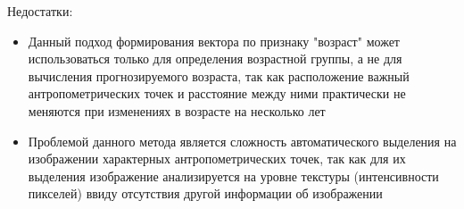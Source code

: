 \documentclass[12pt,a4paper]{article}
\begin{document}
Недостатки:
\begin{itemize}
    \item Данный подход формирования вектора по признаку "возраст" может использоваться только для определения возрастной группы, а не для вычисления прогнозируемого возраста, так как расположение важный антропометрических точек и расстояние между ними практически не меняются при изменениях в возрасте на несколько лет
    \item Проблемой данного метода является сложность автоматического выделения на изображении характерных антропометрических точек, так как для их выделения изображение анализируется на уровне текстуры (интенсивности пикселей) ввиду отсутствия другой информации об изображении
\end{itemize}
\end{document}
